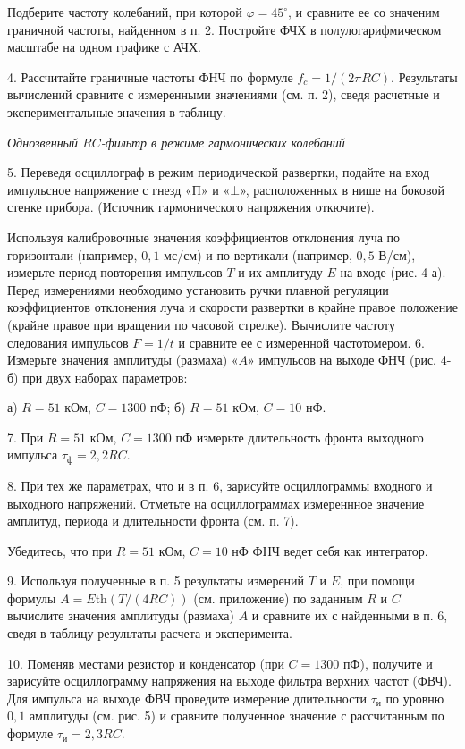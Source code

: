 \documentclass[a4paper,12pt]{report}
\begin{document}
Подберите частоту колебаний, при которой $\varphi=45^{\circ}$, и сравните ее со значеним граничной частоты, найденном в п. 2. Постройте ФЧХ в полулогарифмическом масштабе на одном графике с АЧХ.

4. Рассчитайте граничные частоты ФНЧ по формуле $f_c=1/(2\pi RC)$. Результаты вычислений сравните с измеренными значениями (см. п. 2), сведя расчетные и экспериментальные значения в таблицу.
\begin{center}
\textit{Однозвенный $RC$-фильтр в режиме гармонических колебаний}
\end{center}

 5. Переведя осциллограф в режим периодической развертки, подайте на вход импульсное напряжение с гнезд «$\textrm{П}$» и «$\bot$», расположенных в нише на боковой стенке прибора. (Источник гармонического напряжения откючите).

Используя калибровочные значения коэффициентов отклонения луча по горизонтали (например, $0,1$ мс/см) и по вертикали (например, $0,5$ В/см), измерьте период повторения импульсов $T$ и их амплитуду $E$ на входе (рис. 4-а). Перед измерениями необходимо установить ручки плавной регуляции коэффициентов отклонения луча и скорости развертки в крайне правое положение (крайне правое при вращении по часовой стрелке). Вычислите частоту следования импульсов $F=1/t$ и сравните ее с измеренной частотомером.
6. Измерьте значения амплитуды (размаха) «$A$» импульсов на выходе ФНЧ (рис. 4-б) при двух наборах параметров:

а) $R = 51$ кОм, $C = 1300$ пФ; б) $R = 51$ кОм, $C = 10$ нФ.

7. При $R = 51$ кОм, $C = 1300$ пФ измерьте длительность фронта выходного импульса $\tau_\text{ф}=2,2RC$.

8. При тех же параметрах, что и в п. 6, зарисуйте осциллограммы входного и выходного напряжений. Отметьте на осциллограммах измереннное значение амплитуд, периода и длительности фронта (см. п. 7).

Убедитесь, что при $R = 51$ кОм, $C = 10$ нФ ФНЧ ведет себя как интегратор.

9. Используя полученные в п. 5 результаты измерений $T$ и $E$, при помощи формулы $A=E\text{th}(T/(4RC))$ (см. приложение) по заданным $R$ и $C$ вычислите значения амплитуды (размаха) $A$ и сравните их с найденными в п. 6, сведя в таблицу результаты расчета и эксперимента.
 
10. Поменяв местами резистор и конденсатор (при $C=1300$ пФ), получите и зарисуйте осциллограмму напряжения на выходе фильтра верхних частот (ФВЧ). Для импульса на выходе ФВЧ проведите измерение длительности $\tau_\text{и}$ по уровню $0,1$ амплитуды (см. рис. 5) и сравните полученное значение с рассчитанным по формуле $\tau_\text{и}=2,3 RC$.
\end{document}
